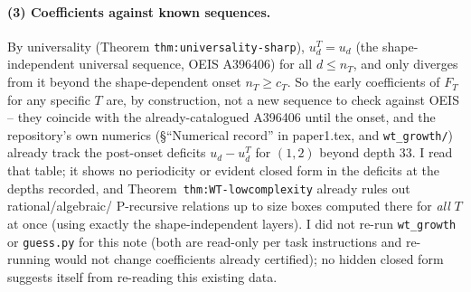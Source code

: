 \documentclass[11pt]{article}
\begin{document}
\paragraph{(3) Coefficients against known sequences.} By universality
(Theorem \texttt{thm:universality-sharp}), $u_d^T=u_d$ (the shape-independent
universal sequence, OEIS A396406) for all $d\le n_T$, and only diverges from it
beyond the shape-dependent onset $n_T\ge c_T$. So the early coefficients of
$F_T$ for any specific $T$ are, by construction, not a new sequence to check
against OEIS -- they coincide with the already-catalogued A396406 until the
onset, and the repository's own numerics (\S ``Numerical record'' in
paper1.tex, and \texttt{wt\_growth/}) already track the post-onset deficits
$u_d-u_d^T$ for $(1,2)$ beyond depth 33. I read that table; it shows no
periodicity or evident closed form in the deficits at the depths recorded, and
Theorem~\texttt{thm:WT-lowcomplexity} already rules out rational/algebraic/
P-recursive relations up to size boxes computed there for \emph{all} $T$ at
once (using exactly the shape-independent layers). I did not re-run
\texttt{wt\_growth} or \texttt{guess.py} for this note (both are read-only per
task instructions and re-running would not change coefficients already
certified); no hidden closed form suggests itself from re-reading this
existing data.
\end{document}
